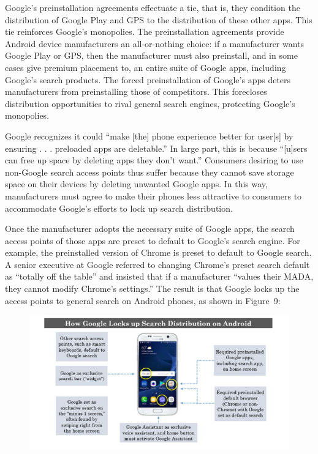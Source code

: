 \documentclass[11pt,b5paper,headings=small]{scrartcl}
\begin{document}
\begin{enumerate}

Google’s preinstallation agreements effectuate a tie, that is, they condition the
distribution of Google Play and GPS to the distribution of these other apps. This tie reinforces
Google’s monopolies. The preinstallation agreements provide Android device manufacturers an
all-or-nothing choice: if a manufacturer wants Google Play or GPS, then the manufacturer must
also preinstall, and in some cases give premium placement to, an entire suite of Google apps,
including Google’s search products. The forced preinstallation of Google’s apps deters
manufacturers from preinstalling those of competitors. This forecloses distribution opportunities
to rival general search engines, protecting Google’s monopolies.


Google recognizes it could “make [the] phone experience better for user[s] by
ensuring . . . preloaded apps are deletable.” In large part, this is because “[u]sers can free up
space by deleting apps they don’t want.” Consumers desiring to use non-Google search access
points thus suffer because they cannot save storage space on their devices by deleting unwanted
Google apps. In this way, manufacturers must agree to make their phones less attractive to
consumers to accommodate Google’s efforts to lock up search distribution.


Once the manufacturer adopts the necessary suite of Google apps, the search
access points of those apps are preset to default to Google’s search engine. For example, the
preinstalled version of Chrome is preset to default to Google search. A senior executive at
Google referred to changing Chrome’s preset search default as “totally off the table” and insisted
that if a manufacturer “values their MADA, they cannot modify Chrome’s settings.” The result is
that Google locks up the access points to general search on Android phones, as shown in
Figure~9:
\begin{figure}
\caption{}
\includegraphics{US-v-Google-Complaint-figures/fig9.PNG}
\end{figure}


\end{enumerate}
\end{document}
